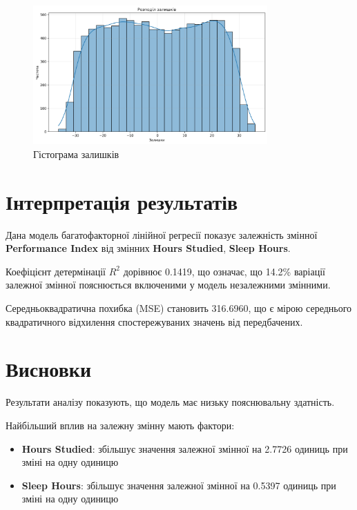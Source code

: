 \documentclass{article}
\begin{document}
    \vspace{0.5cm}
    
    \begin{figure}[H]
       \centering
       \includegraphics[width=0.8\textwidth]{residuals_hist.png}
       \caption{Гістограма залишків}
       \label{fig:гістограма_залишків}
    \end{figure}

    \vspace{0.5cm}
    

    \section{Інтерпретація результатів}

    Дана модель багатофакторної лінійної регресії показує залежність змінної \textbf{Performance Index} від змінних \textbf{Hours Studied}, \textbf{Sleep Hours}.

    Коефіцієнт детермінації $R^2$ дорівнює 0.1419, що означає, що 14.2\% варіації залежної змінної пояснюється включеними у модель незалежними змінними.

    Середньоквадратична похибка (MSE) становить 316.6960, що є мірою середнього квадратичного відхилення спостережуваних значень від передбачених.

    \vspace{0.5cm}

    \section{Висновки}

    Результати аналізу показують, що модель має низьку пояснювальну здатність.
    
    Найбільший вплив на залежну змінну мають фактори:
    \begin{itemize}
        \item \textbf{Hours Studied}: збільшує значення залежної змінної на 2.7726 одиниць при зміні на одну одиницю
    \item \textbf{Sleep Hours}: збільшує значення залежної змінної на 0.5397 одиниць при зміні на одну одиницю
\end{itemize}
    
    
\end{document}
